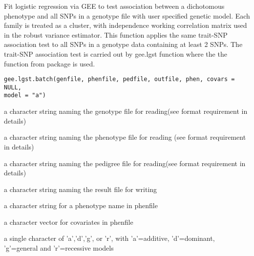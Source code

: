 \begin{Description}\relax
Fit logistic regression via GEE to test association between a dichotomous phenotype 
and all SNPs in a genotype file with user specified genetic model. Each family is treated as 
a cluster, with independence working correlation matrix used in the robust variance estimator.
This function applies the same trait-SNP association test to all SNPs in a genotype data containing 
at least 2 SNPs. The trait-SNP association test is carried out by gee.lgst function where the 
the  function from package  is used.
\end{Description}
\begin{Usage}
\begin{verbatim}
gee.lgst.batch(genfile, phenfile, pedfile, outfile, phen, covars = NULL, 
model = "a")
\end{verbatim}
\end{Usage}
\begin{Arguments}
\begin{ldescription}
\item[\code{genfile}] a character string naming the genotype file for reading(see format requirement in details) 
\item[\code{phenfile}] a character string naming the phenotype file for reading (see format requirement in details) 
\item[\code{pedfile}] a character string naming the pedigree file for reading(see format requirement in details) 
\item[\code{outfile}] a character string naming the result file for writing 
\item[\code{phen}] a character string for a phenotype name in phenfile 
\item[\code{covars}] a character vector for covariates in phenfile 
\item[\code{model}] a single character of 'a','d','g', or 'r', with 'a'=additive, 'd'=dominant, 'g'=general and 'r'=recessive models 
\end{ldescription}
\end{Arguments}
